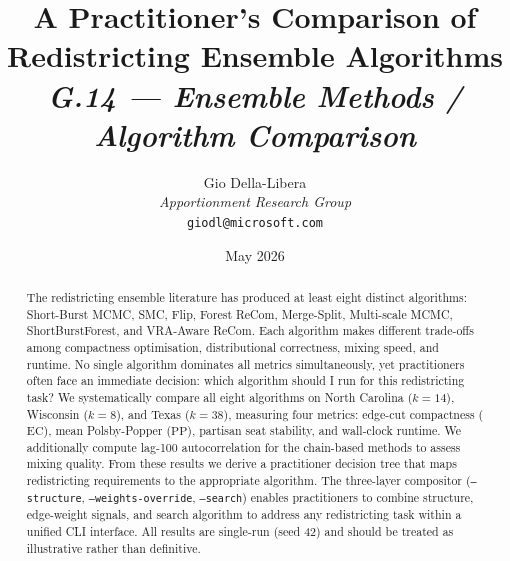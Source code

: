 \documentclass[12pt]{article}
\title{%
  \textbf{A Practitioner's Comparison of Redistricting Ensemble Algorithms}\\[0.8em]
  \normalsize\textit{G.14 --- Ensemble Methods / Algorithm Comparison}%
}
\author{%
  Gio Della-Libera\\
  \textit{Apportionment Research Group}\\
  \small\texttt{giodl@microsoft.com}
}
\date{May 2026}
\newcommand{\ec}{\ensuremath{\mathrm{EC}}}
\newcommand{\pp}{\ensuremath{\mathrm{PP}}}
\begin{document}
\maketitle

\begin{abstract}
\noindent
The redistricting ensemble literature has produced at least eight distinct
algorithms: Short-Burst MCMC, SMC, Flip, Forest ReCom, Merge-Split, Multi-scale
MCMC, ShortBurstForest, and VRA-Aware ReCom.
Each algorithm makes different trade-offs among compactness optimisation,
distributional correctness, mixing speed, and runtime.
No single algorithm dominates all metrics simultaneously, yet practitioners
often face an immediate decision: which algorithm should I run for this
redistricting task?
We systematically compare all eight algorithms on North Carolina ($k = 14$),
Wisconsin ($k = 8$), and Texas ($k = 38$), measuring four metrics: edge-cut
compactness (\ec{}), mean Polsby-Popper (\pp{}), partisan seat stability,
and wall-clock runtime.
We additionally compute lag-100 autocorrelation for the chain-based methods
to assess mixing quality.
From these results we derive a practitioner decision tree that maps
redistricting requirements to the appropriate algorithm.
The three-layer compositor (\texttt{--structure}, \texttt{--weights-override},
\texttt{--search}) enables practitioners to combine structure, edge-weight
signals, and search algorithm to address any redistricting task within a
unified CLI interface.
All results are single-run (seed 42) and should be treated as illustrative
rather than definitive.
\end{abstract}

\tableofcontents
\newpage










\end{document}
